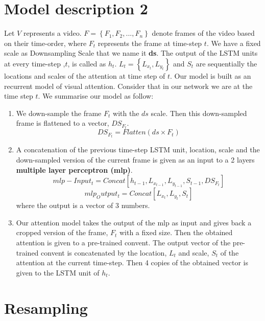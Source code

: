 \documentclass{article} %
\begin{document}
\section{Model description 2}
Let $V$ represents a video. $F=\left \{ F_{1}, F_{2}, ..., F_{n} \right \}$ denote frames of the video based on their time-order, where $F_{t}$ represents the frame at time-step $t$. We have a fixed scale as Downsampling Scale that we name it \textbf{ds}. The output of the LSTM units at every time-step ,$t$, is called as $h_{t}$. $L_{t}=\left \{ L_{x_{t}},L_{y_{t}} \right \}$ and $S_{t}$ are sequentially the locations and scales of the attention at time step of $t$.
Our model is built as an recurrent model of visual attention. Consider that in our network we are at the time step $t$. We summarise our model as follow:
\begin{enumerate}
\item We down-sample the frame $F_{t}$ with the $ds$ scale. Then this down-sampled frame is flattened to a vector, $DS_{F_{t}}$.
\begin{equation}
DS_{F_{t}}=Flatten(ds\times F_{t})
\end{equation} 
\item A concatenation of the previous time-step LSTM unit, location, scale and the down-sampled version of the current frame is given as an input to a 2 layers \textbf{multiple layer perceptron (mlp)}.
\begin{equation}
mlp-Input_{t}=Concat\left [h_{t-1}, L_{x_{t-1}},L_{y_{t-1}}, S_{t-1}, DS_{F_{t}}\right]
\end{equation} 
\begin{equation}
mlp_Output_{t}=Concat\left [ L_{x_{t}}, L_{y_{t}}, S_{t}\right]
\end{equation}
where the output is a vector of 3 numbers.
\item Our attention model takes the output of the mlp as input and gives back a cropped version of the frame, $F_{t}$ with a fixed size. Then the obtained attention is given to a pre-trained convent. The output vector of the pre-trained convent is concatenated by the location, $L_{t}$ and scale, $S_{t}$ of the attention at the current time-step. Then 4 copies of the obtained vector is given to the LSTM unit of $h_{t}$.
\end{enumerate}

\section{Resampling}
\label{sec:resampling}
\end{document}
